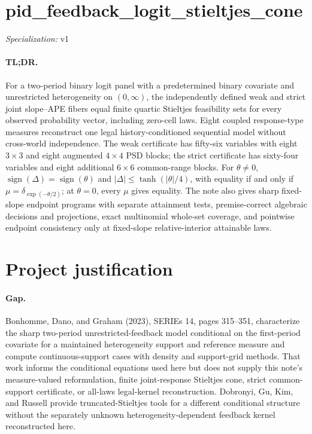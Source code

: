 \documentclass{article}
\begin{document}
\sloppy

\section*{pid\_\allowbreak{}feedback\_\allowbreak{}logit\_\allowbreak{}stieltjes\_\allowbreak{}cone}

\noindent\textit{Specialization:} v1\par

\paragraph{TL;DR.} For a two-period binary logit panel with a predetermined binary covariate and unrestricted heterogeneity on \((0,\infty)\), the independently defined weak and strict joint slope--APE fibers equal finite quartic Stieltjes feasibility sets for every observed probability vector, including zero-cell laws. Eight coupled response-type measures reconstruct one legal history-conditioned sequential model without cross-world independence. The weak certificate has fifty-six variables with eight \(3\times3\) and eight augmented \(4\times4\) PSD blocks; the strict certificate has sixty-four variables and eight additional \(6\times6\) common-range blocks. For \(\theta\ne0\), \(\operatorname{sign}(\Delta)=\operatorname{sign}(\theta)\) and \(|\Delta|\le\tanh(|\theta|/4)\), with equality if and only if \(\mu=\delta_{\exp(-\theta/2)}\); at \(\theta=0\), every \(\mu\) gives equality. The note also gives sharp fixed-slope endpoint programs with separate attainment tests, premise-correct algebraic decisions and projections, exact multinomial whole-set coverage, and pointwise endpoint consistency only at fixed-slope relative-interior attainable laws.

\section{Project justification}

\paragraph{Gap.} Bonhomme, Dano, and Graham (2023), SERIEs 14, pages 315--351, characterize the sharp two-period unrestricted-feedback model conditional on the first-period covariate for a maintained heterogeneity support and reference measure and compute continuous-support cases with density and support-grid methods. That work informs the conditional equations used here but does not supply this note's measure-valued reformulation, finite joint-response Stieltjes cone, strict common-support certificate, or all-laws legal-kernel reconstruction. Dobronyi, Gu, Kim, and Russell provide truncated-Stieltjes tools for a different conditional structure without the separately unknown heterogeneity-dependent feedback kernel reconstructed here.
\end{document}
